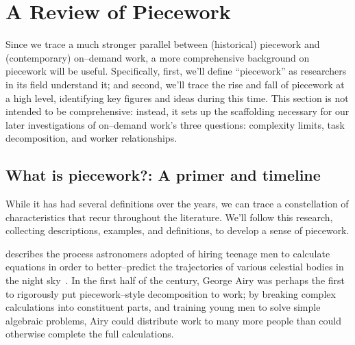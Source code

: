 \documentclass[trackingWork]{subfiles}
\begin{document}
\section{A Review of Piecework}

Since we trace a much stronger parallel between
(historical) piecework and (contemporary) on--demand work,
a more comprehensive background on piecework will be useful.
Specifically,
first, we'll define ``piecework'' as researchers in its field understand it;
and second, we'll trace the rise and fall of piecework at a high level,
identifying key figures and ideas during this time.
This section is not intended to be comprehensive:
instead, it sets up the scaffolding necessary for
our later investigations of on--demand work's three questions:
complexity limits,
task decomposition, and
worker relationships.




\subsection{What is piecework?: A primer and timeline}\label{sec:whatIsPiecework}

While it has had several definitions over the years,
we can trace a constellation of characteristics that recur throughout the literature.
We'll follow this research, collecting
descriptions,
examples, and
definitions,
to develop a sense of piecework.

\citeauthor{grier2013computers} describes the process astronomers adopted of hiring teenage men
to calculate equations in order
to better--predict the trajectories of various celestial bodies in the night sky~\cite{grier2013computers}.
In the first half of the  century, George Airy was perhaps the first to rigorously put piecework--style decomposition to work;
by breaking complex calculations into constituent parts, and
training young men to solve simple algebraic problems,
Airy could distribute work to many more people than could otherwise complete the full calculations.
\end{document}
